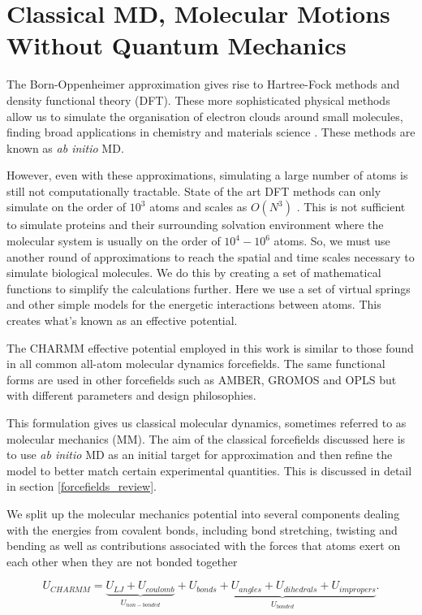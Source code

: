 \section{Classical MD, Molecular Motions Without Quantum Mechanics}
The Born-Oppenheimer approximation gives rise to Hartree-Fock methods and density functional theory (DFT). These more sophisticated physical methods allow us to simulate the organisation of electron clouds around small molecules, finding broad applications in chemistry and materials science \cite{vanmourik2014}. These methods are known as \textit{ab initio} MD. 

However, even with these approximations, simulating a large number of atoms is still not computationally tractable. State of the art DFT methods can only simulate on the order of $10^3$ atoms \cite{luo2020} and scales as $O(N^3)$ \cite{kresse1996}. This is not sufficient to simulate proteins and their surrounding solvation environment where the molecular system is usually on the order of $10^4-10^6$ atoms. So, we must use another round of approximations to reach the spatial and time scales necessary to simulate biological molecules. We do this by creating a set of mathematical functions to simplify the calculations further. Here we use a set of virtual springs and other simple models for the energetic interactions between atoms. This creates what's known as an effective potential. 


The CHARMM effective potential employed in this work is similar to those found in all common all-atom molecular dynamics forcefields. The same  functional forms are used in other forcefields such as AMBER, GROMOS and OPLS but with different parameters and design philosophies\cite{lemkul2020}. 

This formulation gives us classical molecular dynamics, sometimes referred to as molecular mechanics (MM). The aim of the classical forcefields discussed here is to use \textit {ab initio} MD as an initial target for approximation and then refine the model to better match certain experimental quantities. This is discussed in detail in section \ref{forcefields_review}.

We split up the molecular mechanics potential into several components dealing with the energies from covalent bonds, including bond stretching, twisting and bending as well as contributions associated with the forces that atoms exert on each other when they are not bonded together 

\begin{equation}
	U_{CHARMM} = \underbrace{U_{LJ} + U_{coulomb}}_{U_{non-bonded}} + \underbrace{U_{bonds} + U_{angles} + U_{dihedrals} + U_{impropers}}_{U_{bonded} }.
	\label{CHARMM_effective_potential_eq}
\end{equation}

